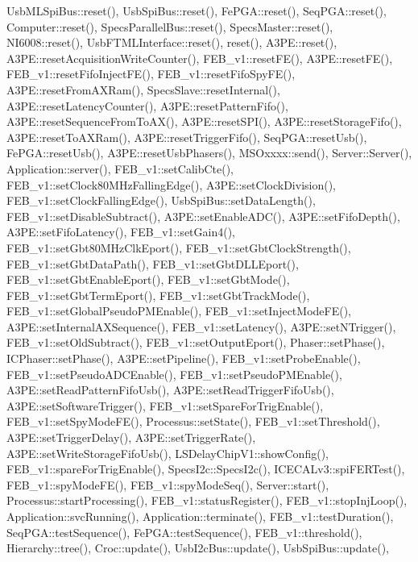 Usb\+M\+L\+Spi\+Bus\+::reset(), Usb\+Spi\+Bus\+::reset(), Fe\+P\+G\+A\+::reset(), Seq\+P\+G\+A\+::reset(), Computer\+::reset(), Specs\+Parallel\+Bus\+::reset(), Specs\+Master\+::reset(), N\+I6008\+::reset(), Usb\+F\+T\+M\+L\+Interface\+::reset(), reset(), A3\+P\+E\+::reset(), A3\+P\+E\+::reset\+Acquisition\+Write\+Counter(), F\+E\+B\+\_\+v1\+::reset\+F\+E(), A3\+P\+E\+::reset\+F\+E(), F\+E\+B\+\_\+v1\+::reset\+Fifo\+Inject\+F\+E(), F\+E\+B\+\_\+v1\+::reset\+Fifo\+Spy\+F\+E(), A3\+P\+E\+::reset\+From\+A\+X\+Ram(), Specs\+Slave\+::reset\+Internal(), A3\+P\+E\+::reset\+Latency\+Counter(), A3\+P\+E\+::reset\+Pattern\+Fifo(), A3\+P\+E\+::reset\+Sequence\+From\+To\+A\+X(), A3\+P\+E\+::reset\+S\+P\+I(), A3\+P\+E\+::reset\+Storage\+Fifo(), A3\+P\+E\+::reset\+To\+A\+X\+Ram(), A3\+P\+E\+::reset\+Trigger\+Fifo(), Seq\+P\+G\+A\+::reset\+Usb(), Fe\+P\+G\+A\+::reset\+Usb(), A3\+P\+E\+::reset\+Usb\+Phasers(), M\+S\+Oxxxx\+::send(), Server\+::\+Server(), Application\+::server(), F\+E\+B\+\_\+v1\+::set\+Calib\+Cte(), F\+E\+B\+\_\+v1\+::set\+Clock80\+M\+Hz\+Falling\+Edge(), A3\+P\+E\+::set\+Clock\+Division(), F\+E\+B\+\_\+v1\+::set\+Clock\+Falling\+Edge(), Usb\+Spi\+Bus\+::set\+Data\+Length(), F\+E\+B\+\_\+v1\+::set\+Disable\+Subtract(), A3\+P\+E\+::set\+Enable\+A\+D\+C(), A3\+P\+E\+::set\+Fifo\+Depth(), A3\+P\+E\+::set\+Fifo\+Latency(), F\+E\+B\+\_\+v1\+::set\+Gain4(), F\+E\+B\+\_\+v1\+::set\+Gbt80\+M\+Hz\+Clk\+Eport(), F\+E\+B\+\_\+v1\+::set\+Gbt\+Clock\+Strength(), F\+E\+B\+\_\+v1\+::set\+Gbt\+Data\+Path(), F\+E\+B\+\_\+v1\+::set\+Gbt\+D\+L\+L\+Eport(), F\+E\+B\+\_\+v1\+::set\+Gbt\+Enable\+Eport(), F\+E\+B\+\_\+v1\+::set\+Gbt\+Mode(), F\+E\+B\+\_\+v1\+::set\+Gbt\+Term\+Eport(), F\+E\+B\+\_\+v1\+::set\+Gbt\+Track\+Mode(), F\+E\+B\+\_\+v1\+::set\+Global\+Pseudo\+P\+M\+Enable(), F\+E\+B\+\_\+v1\+::set\+Inject\+Mode\+F\+E(), A3\+P\+E\+::set\+Internal\+A\+X\+Sequence(), F\+E\+B\+\_\+v1\+::set\+Latency(), A3\+P\+E\+::set\+N\+Trigger(), F\+E\+B\+\_\+v1\+::set\+Old\+Subtract(), F\+E\+B\+\_\+v1\+::set\+Output\+Eport(), Phaser\+::set\+Phase(), I\+C\+Phaser\+::set\+Phase(), A3\+P\+E\+::set\+Pipeline(), F\+E\+B\+\_\+v1\+::set\+Probe\+Enable(), F\+E\+B\+\_\+v1\+::set\+Pseudo\+A\+D\+C\+Enable(), F\+E\+B\+\_\+v1\+::set\+Pseudo\+P\+M\+Enable(), A3\+P\+E\+::set\+Read\+Pattern\+Fifo\+Usb(), A3\+P\+E\+::set\+Read\+Trigger\+Fifo\+Usb(), A3\+P\+E\+::set\+Software\+Trigger(), F\+E\+B\+\_\+v1\+::set\+Spare\+For\+Trig\+Enable(), F\+E\+B\+\_\+v1\+::set\+Spy\+Mode\+F\+E(), Processus\+::set\+State(), F\+E\+B\+\_\+v1\+::set\+Threshold(), A3\+P\+E\+::set\+Trigger\+Delay(), A3\+P\+E\+::set\+Trigger\+Rate(), A3\+P\+E\+::set\+Write\+Storage\+Fifo\+Usb(), L\+S\+Delay\+Chip\+V1\+::show\+Config(), F\+E\+B\+\_\+v1\+::spare\+For\+Trig\+Enable(), Specs\+I2c\+::\+Specs\+I2c(), I\+C\+E\+C\+A\+Lv3\+::spi\+F\+E\+R\+Test(), F\+E\+B\+\_\+v1\+::spy\+Mode\+F\+E(), F\+E\+B\+\_\+v1\+::spy\+Mode\+Seq(), Server\+::start(), Processus\+::start\+Processing(), F\+E\+B\+\_\+v1\+::status\+Register(), F\+E\+B\+\_\+v1\+::stop\+Inj\+Loop(), Application\+::svc\+Running(), Application\+::terminate(), F\+E\+B\+\_\+v1\+::test\+Duration(), Seq\+P\+G\+A\+::test\+Sequence(), Fe\+P\+G\+A\+::test\+Sequence(), F\+E\+B\+\_\+v1\+::threshold(), Hierarchy\+::tree(), Croc\+::update(), Usb\+I2c\+Bus\+::update(), Usb\+Spi\+Bus\+::update(), 